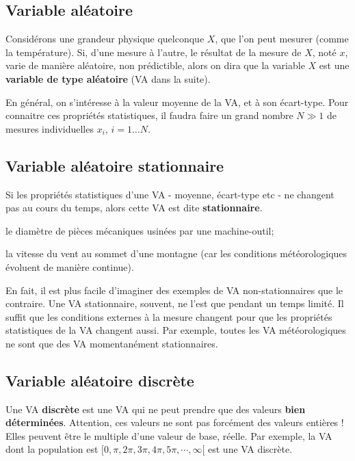 \subsection{Variable aléatoire}

Considérons une grandeur physique quelconque $X$, que l'on peut mesurer (comme la température). Si, d'une mesure à l'autre, le résultat de la mesure de $X$, noté $x$, varie de manière aléatoire, non prédictible, alors on dira que la variable $X$ est une \textbf{variable de type aléatoire} (VA dans la suite).

En général, on s'intéresse à la valeur moyenne de la VA, et à son écart-type. Pour connaitre ces propriétés statistiques, il faudra faire un grand nombre $N\gg 1$ de mesures individuelles $x_i$, $i=1\dots N$.

\subsection{Variable aléatoire stationnaire}

Si les propriétés statistiques d'une VA - moyenne, écart-type etc - ne changent pas au cours du temps, alors cette VA est dite \textbf{stationnaire}.
\begin{description}\itemsep1pt
\renewcommand{\labelitemi}{$\bullet$}
\item[Un exemple de VA stationnaire~:] le diamètre de pièces mécaniques usinées par une machine-outil;
\item[Un exemple de VA non-stationnaire~:] la vitesse du vent au sommet d'une montagne (car les conditions météorologiques évoluent de manière continue).
\end{description}
En fait, il est plus facile d'imaginer des exemples de VA non-stationnaires que le contraire. Une VA stationnaire, souvent, ne l'est que pendant un temps limité. Il suffit que les conditions externes à la mesure changent pour que les propriétés statistiques de la VA changent aussi. Par exemple, toutes les VA météorologiques ne sont que des VA momentanément stationnaires.

\subsection{Variable aléatoire discrète}

Une VA \textbf{discrète} est une VA qui ne peut prendre que des valeurs \textbf{bien déterminées}. Attention, ces valeurs ne sont pas forcément des valeurs entières ! Elles peuvent être le multiple d'une valeur de base, réelle. Par exemple, la VA dont la population est $[0,\pi,2\pi,3\pi,4\pi,5\pi,\cdots,\infty[$ est une VA discrète.

